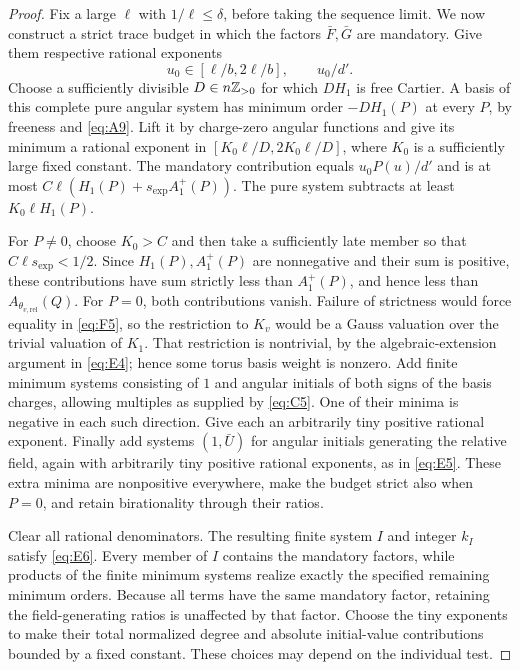 \begin{proof}
Fix a large $\ell$ with $1/\ell\le\delta$, before taking the
sequence limit.  We now construct a strict trace budget in which
the factors $\bar F,\bar G$ are mandatory.  Give them respective
rational exponents
\[
          u_0\in[\ell/b,2\ell/b],\qquad u_0/d'.
\]
Choose a sufficiently divisible $D\in n\mathbb Z_{>0}$ for which
$DH_1$ is free Cartier.  A basis of this complete pure angular
system has minimum order $-DH_1(P)$ at every $P$, by freeness
and \eqref{eq:A9}.  Lift it by charge-zero angular functions and
give its minimum a rational exponent in
$[K_0\ell/D,2K_0\ell/D]$, where $K_0$ is a sufficiently large
fixed constant.  The mandatory contribution equals
$u_0P(u)/d'$ and is at most
$C\ell(H_1(P)+s_{\exp}A_1^+(P))$.  The pure system subtracts
at least $K_0\ell H_1(P)$.

For $P\ne0$, choose $K_0>C$ and then take a sufficiently late
member so that $C\ell s_{\exp}<1/2$.  Since $H_1(P),A_1^+(P)$
are nonnegative and their sum is positive, these contributions
have sum strictly less than $A_1^+(P)$, and hence less than
$A_{\theta_{v,\mathrm{rel}}}(Q)$.
For $P=0$, both contributions vanish.  Failure of strictness would
force equality in \eqref{eq:F5}, so the restriction to $K_v$ would
be a Gauss valuation over the trivial valuation of $K_1$.
That restriction is nontrivial, by the algebraic-extension argument
in \eqref{eq:E4}; hence some torus basis weight is nonzero.
Add finite minimum systems consisting of $1$ and angular initials
of both signs of the basis charges, allowing multiples as supplied
by \eqref{eq:C5}.  One of their minima is negative in each such
direction.  Give each an arbitrarily tiny positive rational
exponent.  Finally add systems $(1,\bar U)$ for angular initials
generating the relative field, again with arbitrarily tiny positive
rational exponents, as in \eqref{eq:E5}.  These extra minima are
nonpositive everywhere, make the budget strict also when $P=0$,
and retain birationality through their ratios.

Clear all rational denominators.  The resulting finite system $I$
and integer $k_I$ satisfy \eqref{eq:E6}.  Every member of $I$
contains the mandatory factors, while products of the finite
minimum systems realize exactly the specified remaining minimum
orders.  Because all terms have the same mandatory factor,
retaining the field-generating ratios is unaffected by that factor.
Choose the tiny exponents to make their total normalized degree
and absolute initial-value contributions bounded by a fixed
constant.  These choices may depend on the individual test.


\end{proof}
